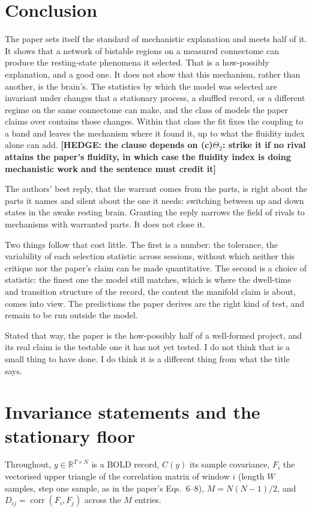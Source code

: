 \documentclass[11pt]{article}
\newcommand{\HEDGE}[1]{\textcolor{green!40!black}{\textbf{[HEDGE: #1]}}}
\begin{document}
\section{Conclusion}
The paper sets itself the standard of mechanistic explanation and meets half of it. It shows that a network of bistable regions on a measured connectome can produce the resting-state phenomena it selected. That is a how-possibly explanation, and a good one. It does not show that this mechanism, rather than another, is the brain's. The statistics by which the model was selected are invariant under changes that a stationary process, a shuffled record, or a different regime on the same connectome can make, and the class of models the paper claims over contains those changes. Within that class the fit fixes the coupling to a band and leaves the mechanism where it found it, up to what the fluidity index alone can add. \HEDGE{the clause depends on (c)$\Theta_2$: strike it if no rival attains the paper's fluidity, in which case the fluidity index is doing mechanistic work and the sentence must credit it}

The authors' best reply, that the warrant comes from the parts, is right about the parts it names and silent about the one it needs: switching between up and down states in the awake resting brain. Granting the reply narrows the field of rivals to mechanisms with warranted parts. It does not close it.

Two things follow that cost little. The first is a number: the tolerance, the variability of each selection statistic across sessions, without which neither this critique nor the paper's claim can be made quantitative. The second is a choice of statistic: the finest one the model still matches, which is where the dwell-time and transition structure of the record, the content the manifold claim is about, comes into view. The predictions the paper derives are the right kind of test, and remain to be run outside the model.

Stated that way, the paper is the how-possibly half of a well-formed project, and its real claim is the testable one it has not yet tested. I do not think that is a small thing to have done. I do think it is a different thing from what the title says.

\appendix
\section{Invariance statements and the stationary floor}
Throughout, $y\in\mathbb{R}^{T\times N}$ is a BOLD record, $C(y)$ its sample covariance, $F_i$ the vectorised upper triangle of the correlation matrix of window $i$ (length $W$ samples, step one sample, as in the paper's Eqs.~6--8), $M=N(N-1)/2$, and $D_{ij}=\operatorname{corr}(F_i,F_j)$ across the $M$ entries.
\end{document}
